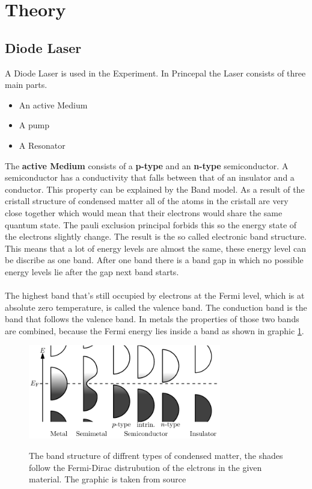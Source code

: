 \section{Theory}
\label{sec:Theorie}

\subsection{Diode Laser}

A Diode Laser is used in the Experiment.
In Princepal the Laser consists of three main parts.
\begin{itemize}
    \item An active Medium
    \item A pump
    \item A Resonator
\end{itemize}
The \textbf{active Medium} consists of a \textbf{p-type} and an \textbf{n-type} semiconductor.
A semiconductor has a conductivity that falls between that of an insulator and a conductor.
This property can be explained by the Band model. 
As a result of the cristall structure of condensed matter all of the atoms in the cristall are very close together which would mean that their electrons would share the same quantum state.
The pauli exclusion principal forbids this so the energy state of the electrons slightly change.
The result is the so called electronic band structure.
This means that a lot of energy levels are almost the same, these energy level can be discribe as one band.
After one band there is a band gap in which no possible energy levels lie after the gap next band starts.
\\\\
The highest band that's still occupied by electrons at the Fermi level, which is at absolute zero temperature, is called the valence band.
The conduction band is the band that follows the valence band.
In metals the properties of those two bands are combined, because the Fermi energy lies inside a band as shown in graphic \ref{fig:band_structure}.

\begin{figure}
    \centering
    \caption{The band structure of diffrent types of condensed matter, the shades follow the Fermi-Dirac distrubution of the elctrons in the given material. The graphic is taken from source \cite{wikipedia_valence_conduction_band}}
    \includegraphics[width=0.75\textwidth]{content/data/Band_structure_diffrent_materials}
    \label{fig:band_structure}
\end{figure}


